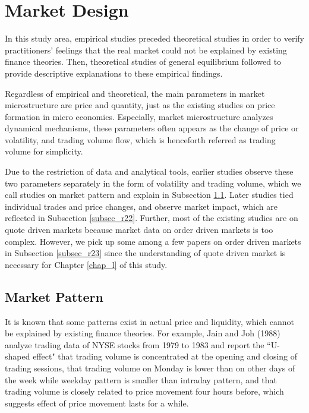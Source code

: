 \section{Market Design}\label{sec_r2}
In this study area, empirical studies preceded theoretical studies in order to verify practitioners' feelings that the real market could not be explained by existing finance theories.  Then, theoretical studies of general equilibrium followed to provide descriptive explanations to these empirical findings.

Regardless of empirical and theoretical, the main parameters in market microstructure are price and quantity, just as the existing studies on price formation in micro economics.  Especially, market microstructure analyzes dynamical mechanisms, these parameters often appears as the change of price or volatility, and trading volume flow, which is henceforth referred as trading volume for simplicity.  

Due to the restriction of data and analytical tools, earlier studies observe these two parameters separately in the form of volatility and trading volume, which we call studies on market pattern and explain in Subsection \ref{subsec_r21}.  Later studies tied individual trades and price changes, and observe market impact, which are reflected in Subsection \ref{subsec_r22}.  Further, most of the existing studies are on quote driven markets because market data on order driven markets is too complex.  However, we pick up some among a few papers on order driven markets in Subsection \ref{subsec_r23} since the understanding of quote driven market is necessary for Chapter \ref{chap_l} of this study.


\subsection{Market Pattern}\label{subsec_r21}
It is known that some patterns exist in actual price and liquidity, which cannot be explained by existing finance theories.  For example, Jain and Joh (1988) analyze trading data of NYSE stocks from 1979 to 1983 and report the ``U-shaped effect" that trading volume is concentrated at the opening and closing of trading sessions, that trading volume on Monday is lower than on other days of the week while weekday pattern is smaller than intraday pattern, and that trading volume is closely related to price movement four hours before, which suggests effect of price movement lasts for a while.

